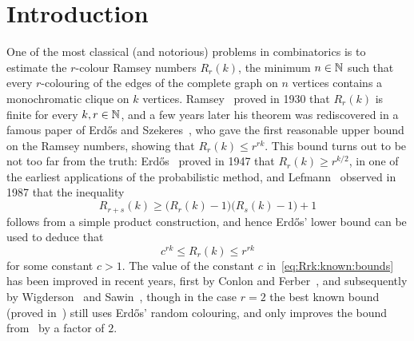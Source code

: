 \section{Introduction}

One of the most classical (and notorious) problems in combinatorics is to estimate the $r$-colour Ramsey numbers $R_r(k)$, the minimum $n \in \mathbb{N}$ such that every $r$-colouring of the edges of the complete graph on $n$ vertices contains a monochromatic clique on $k$ vertices. Ramsey~\cite{R30} proved in 1930 that $R_r(k)$ is finite for every $k,r \in \mathbb{N}$, and a few years later his theorem was rediscovered in a famous paper of Erd\H{o}s and Szekeres~\cite{ESz35}, who gave the first reasonable upper bound on the Ramsey numbers, showing that $R_r(k) \le r^{rk}$. %
This bound turns out to be not too far from the truth: Erd\H{o}s~\cite{E47} proved in 1947 that $R_r(k) \ge r^{k/2}$, in one of the earliest applications of the probabilistic method, and Lefmann~\cite{L87} observed in 1987 that the inequality 
$$R_{r+s}(k) \ge \big( R_r(k) - 1 \big) \big( R_s(k) - 1 \big) + 1$$
follows from a simple product construction, and hence Erd\H{o}s' lower bound can be used to deduce that
\begin{equation}\label{eq:Rrk:known:bounds}
c^{rk} \le R_r(k) \le r^{rk}
\end{equation}
for some constant $c > 1$. The value of the constant $c$ in~\eqref{eq:Rrk:known:bounds} has been improved in recent years, first by Conlon and Ferber~\cite{CF}, and subsequently by Wigderson~\cite{W} and Sawin~\cite{S}, though in the case $r = 2$ the best known bound (proved in~\cite{S77}) still uses Erd\H{o}s' random colouring, and only improves the bound from~\cite{E47} by a factor of $2$. 

